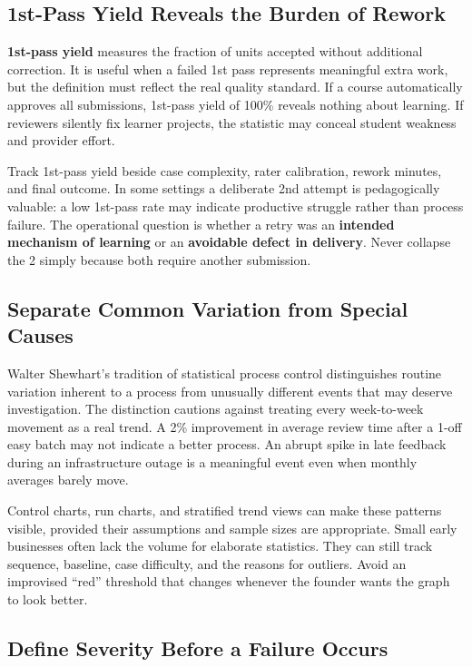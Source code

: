 \subsection{1st-Pass Yield Reveals the Burden of Rework}
\label{sec:first_pass_yield}

\textbf{1st-pass yield} measures the fraction of units accepted without additional correction. It is useful when a failed 1st pass represents meaningful extra work, but the definition must reflect the real quality standard. If a course automatically approves all submissions, 1st-pass yield of 100\% reveals nothing about learning. If reviewers silently fix learner projects, the statistic may conceal student weakness and provider effort.

Track 1st-pass yield beside case complexity, rater calibration, rework minutes, and final outcome. In some settings a deliberate 2nd attempt is pedagogically valuable: a low 1st-pass rate may indicate productive struggle rather than process failure. The operational question is whether a retry was an \textbf{intended mechanism of learning} or an \textbf{avoidable defect in delivery}. Never collapse the 2 simply because both require another submission.

\subsection{Separate Common Variation from Special Causes}
\label{sec:common_vs_special_causes}

Walter Shewhart's tradition of statistical process control distinguishes routine variation inherent to a process from unusually different events that may deserve investigation. The distinction cautions against treating every week-to-week movement as a real trend. A 2\% improvement in average review time after a 1-off easy batch may not indicate a better process. An abrupt spike in late feedback during an infrastructure outage is a meaningful event even when monthly averages barely move.

Control charts, run charts, and stratified trend views can make these patterns visible, provided their assumptions and sample sizes are appropriate. Small early businesses often lack the volume for elaborate statistics. They can still track sequence, baseline, case difficulty, and the reasons for outliers. Avoid an improvised ``red'' threshold that changes whenever the founder wants the graph to look better.

\subsection{Define Severity Before a Failure Occurs}
\label{sec:define_severity}

